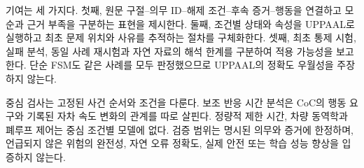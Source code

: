 \begin{revision}
기여는 세 가지다. 첫째, 원문 구절--의무 ID--해제 조건--후속 증거--행동을 연결하고 모순과 근거 부족을 구분하는 표현을 제시한다. 둘째, 조건별 상태와 속성을 UPPAAL로 실행하고 최초 문제 위치와 사유를 추적하는 절차를 구체화한다. 셋째, 최초 통제 시험, 실패 분석, 동일 사례 재시험과 자연 자료의 해석 한계를 구분하여 적용 가능성을 보고한다. 단순 FSM도 같은 사례를 모두 판정했으므로 UPPAAL의 정확도 우월성을 주장하지 않는다.

중심 검사는 고정된 사건 순서와 조건을 다룬다. 보조 반응 시간 분석은 CoC의 행동 요구와 기록된 자차 속도 변화의 관계를 따로 살핀다. 정량적 제한 시간, 차량 동역학과 폐루프 제어는 중심 조건별 모델에 없다. 검증 범위는 명시된 의무와 증거에 한정하며, 언급되지 않은 위험의 완전성, 자연 오류 정확도, 실제 안전 또는 학습 성능 향상을 입증하지 않는다.
\end{revision}
